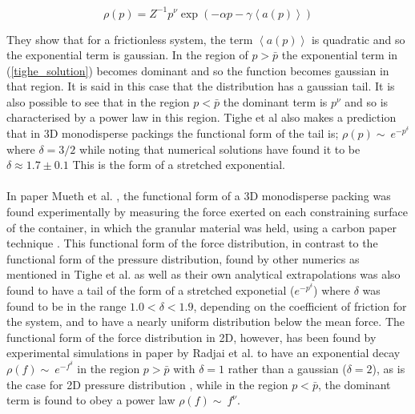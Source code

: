 \documentclass[12pt] {article} %
\begin{document}
\begin{equation}
	\rho(p)=Z^{-1}p^{\nu}\exp(-\alpha p-\gamma\left\langle a(p)\right\rangle ) \label{tighe_solution}
\end{equation}

They show that for a frictionless system, the term $\left\langle a(p)\right\rangle$ is quadratic and so the exponential term is gaussian. In the region of $p>\bar{p}$ the exponential term in (\ref{tighe_solution}) becomes dominant and so the function becomes gaussian in that region. It is said in this case that the distribution has a gaussian tail. It is also possible to see that in the region $p<\bar{p}$ the dominant term is $p^{\nu}$ and so is characterised by a power law in this region. Tighe et al also makes a prediction that in 3D monodisperse packings the functional form of the tail is; $\rho(p) \sim\ e^{-p^{\delta}}$ where $\delta = 3/2$ while noting that numerical solutions have found it to be $\delta \approx 1.7 \pm 0.1$ This is the form of a stretched exponential.\\
\\
In paper Mueth et al. \cite{mueth}, the functional form of a 3D monodisperse packing was found experimentally by measuring the force exerted on each constraining surface of the container, in which the granular material was held, using a carbon paper technique \cite{mueth}. This functional form of the force distribution, in contrast to the functional form of the pressure distribution, found by other numerics as mentioned in Tighe et al. \cite{tighepaper} as well as their own analytical extrapolations was also found to have a tail of the form of a stretched exponetial ($e^{-p^{\delta}}$) where $\delta$ was found to be in the range $1.0<\delta<1.9$, depending on the coefficient of friction for the system, and to have a nearly uniform distribution below the mean force. The functional form of the force distribution in 2D, however, has been found by experimental simulations in paper by Radjai et al. \cite{radjai} to have an exponential decay $\rho(f) \sim\ e^{-f^{\delta}}$ in the region $p>\bar{p}$ with $\delta = 1$ rather than a gaussian ($\delta = 2$), as is the case for 2D pressure distribution \cite{tighepaper}, while in the region $p<\bar{p}$, the dominant term is found to obey a power law $\rho(f) \sim\ f^{\nu}$.
\end{document}
